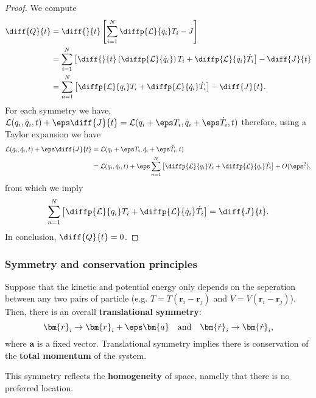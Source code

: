 \documentclass[12pt, a4paper]{article}
\newcommand{\LL}{\mathcal L}
\begin{document}
\begin{proof}
    We compute 
    \[\begin{aligned}
        \diff{Q}{t} &= \diff{}{t} \left[ \sum_{i=1}^{N} \diffp{\mathcal{L}}{{\dot{q}_i}} T_i -J \right] \\
        &= \sum_{i=1}^{N}\left[ \diff{}{t}\left( \diffp{\LL}{{\dot{q}_i}} \right) T_i + \diffp{\LL}{{\dot{q}_i}}\dot{T}_i \right] -\diff{J}{t} \\
        &= \sum_{n=1}^{N} \left[ \diffp{\LL}{{q_i}}T_i +\diffp{\LL}{{\dot{q}_i}}\dot{T}_i \right]-\diff{J}{t}.
    \end{aligned}\]
    For each symmetry we have, \(\LL(q_i,\dot{q}_i,t)+ \eps\diff{J}{t}=\LL(q_i +\eps T_i,\dot{q}_i+\eps \dot{T}_i,t)\) therefore, using a Taylor expansion we have 
    \[\begin{aligned}
         \LL(q_i,\dot{q}_i,t) + \eps\diff{J}{t} &= \LL(q_i +\eps T_i,\dot{q}_i+\eps \dot{T}_i,t) \\
        &= \LL(q_i,\dot{q}_i,t) + \eps \sum_{n=1}^{N} \left[ \diffp{\LL}{{q_i}} T_i +\diffp{\LL}{{\dot{q}_i}} \dot{T}_i \right]+O(\eps^2),
    \end{aligned}\]
    from which we imply 
    \[\sum_{n=1}^{N} \left[ \diffp{\LL}{{q_i}}T_i +\diffp{\LL}{{\dot{q}_i}}\dot{T}_i \right] = \diff{J}{t}.\]
    In conclusion, \(\diff{Q}{t}=0\).
\end{proof}

\subsubsection{Symmetry and conservation principles}

\begin{mdthm}
    Suppose that the kinetic and potential energy only depends on the seperation between any two pairs of particle (e.g. \(T = T(\bm{r}_i-\bm{r}_j)\) and \(V=V(\bm{r}_i-\bm{r}_j)\)). Then, there is an overall \textbf{translational symmetry}: 
    \[\bm{r}_i \to \bm{r}_i +\eps \bm{a} \quad \text{and} \quad \bm{\dot{r}}_i \to \bm{\dot{r}}_i,\]
    where \(\bm{a}\) is a fixed vector. Translational symmetry implies there is conservation of the \textbf{total momentum} of the system.
\end{mdthm}

\begin{mdremark}
    This symmetry reflects the \textbf{homogeneity} of space, namelly that there is no preferred location.
\end{mdremark}
\end{document}

